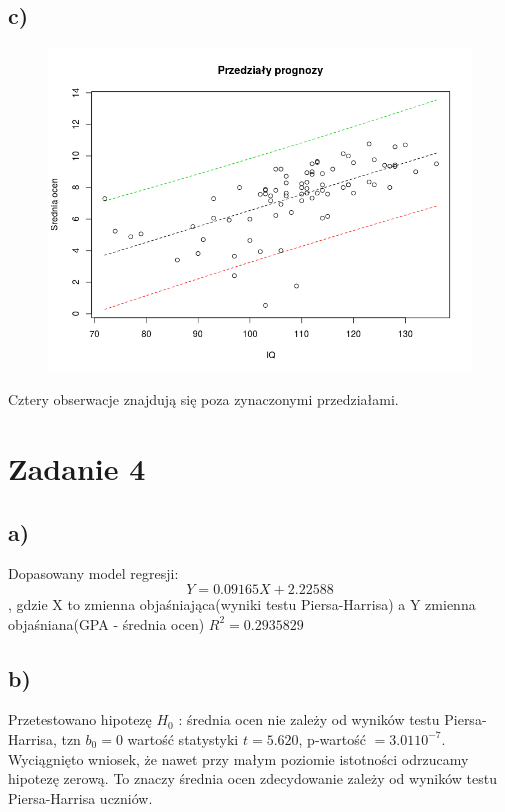 \documentclass[9pt]{article}  %
\begin{document}
  \subsection{c)}
    \begin{figure}[H]
      \centering
      \includegraphics[width=1\textwidth]{3c.png}
      \caption {}
    \end{figure} 
    Cztery obserwacje znajdują się poza zynaczonymi przedziałami.

\section{Zadanie 4}

  \subsection{a)}
    Dopasowany model regresji: $$Y = 0.09165 X + 2.22588 $$ , gdzie X to zmienna objaśniająca(wyniki testu Piersa-Harrisa) a Y zmienna objaśniana(GPA - średnia ocen) \newline
    $R^2 = 0.2935829$ 
  
  \subsection{b)}
    Przetestowano hipotezę $H_0$ : średnia ocen nie zależy od wyników testu Piersa-Harrisa, tzn $b_0 = 0$ \newline
    wartość statystyki $t = 5.620$, p-wartość $= 3.01 10^{-7}$. Wyciągnięto wniosek, że nawet przy małym poziomie istotności odrzucamy hipotezę zerową. To znaczy średnia ocen zdecydowanie zależy od wyników testu Piersa-Harrisa uczniów.
\end{document}

